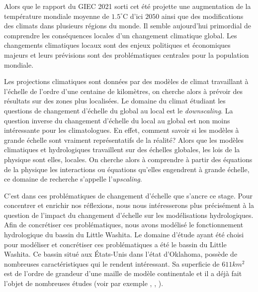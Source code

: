 \documentclass[a4paper,11pt]{article}
\numberwithin{equation}{section}
\begin{document}
Alors que le rapport du GIEC 2021 sorti cet été projette une augmentation de la température mondiale moyenne de $1.5^{\circ}$C d'ici $2050$ ainsi que des modifications des climats dans plusieurs régions du monde. Il semble aujourd'hui primordial de comprendre les conséquences locales d'un changement climatique global. Les changements climatiques locaux sont des enjeux politiques et économiques majeurs et leurs prévisions sont des problématiques centrales pour la population mondiale.

Les projections climatiques sont données par des modèles de climat travaillant à l'échelle de l'ordre d'une centaine de kilomètres, on cherche alors à prévoir des résultats sur des zones plus localisées. Le domaine du climat étudiant les questions de changement d'échelle du global au local est le \textit{downscaling}. La question inverse du changement d'échelle du local au global est non moins intéressante pour les climatologues. En effet, comment savoir si les modèles à grande échelle sont vraiment représentatifs de la réalité? Alors que les modèles climatiques et hydrologiques travaillent sur des échelles globales, les lois de la physique sont elles, locales. On cherche alors à comprendre à partir des équations de la physique les interactions ou équations qu'elles engendrent à grande échelle, ce domaine de recherche s'appelle l'\textit{upscaling}. 

C'est dans ces problématiques de changement d'échelle que s'ancre ce stage. Pour concentrer et enrichir nos réflexions, nous nous intéresserons plus précisément à la question de l'impact du changement d'échelle sur les modélisations hydrologiques. Afin de concrétiser ces problématiques, nous avons modélisé le fonctionnement hydrologique du bassin du Little Washita. 
Le domaine d'étude ayant été choisi pour modéliser et concrétiser ces problématiques a été le bassin du Little Washita. Ce bassin situé aux États-Unis dans l’état d’Oklahoma, possède de nombreuses caractéristiques qui le rendent intéressant. Sa superficie de $611km^2$ est de l'ordre de grandeur d'une maille de modèle continentale et il a déjà fait l'objet de nombreuses études (voir par exemple \cite{maxwell2007groundwater}, \cite{rosero2011ensemble}, \cite{maquin2016developpement}). 

\vspace{0.7cm}
\end{document}
